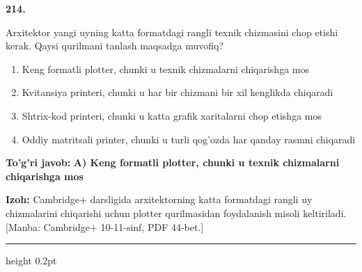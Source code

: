 \documentclass[10pt,a4paper]{article}
\begin{document}
{\bfseries\sffamily\color{ink} 214.}
\par
Arxitektor yangi uyning katta formatdagi rangli texnik chizmasini chop etishi kerak. Qaysi qurilmani tanlash maqsadga muvofiq?
\begin{enumerate}[label=\Alph*),leftmargin=9mm]
\item Keng formatli plotter, chunki u texnik chizmalarni chiqarishga mos
\item Kvitansiya printeri, chunki u har bir chizmani bir xil kenglikda chiqaradi
\item Shtrix-kod printeri, chunki u katta grafik xaritalarni chop etishga mos
\item Oddiy matritsali printer, chunki u turli qog'ozda har qanday rasmni chiqaradi
\end{enumerate}
\begin{tcolorbox}[enhanced,breakable,colback=teal!4,colframe=teal!60!black,boxrule=0.45pt,arc=1.2mm,left=2.7mm,right=2.7mm,top=1.8mm,bottom=1.8mm,before skip=2mm,after skip=2mm]
{\bfseries\sffamily\color{teal}To'g'ri javob:} \textbf{A) Keng formatli plotter, chunki u texnik chizmalarni chiqarishga mos}
\par\smallskip
{\bfseries Izoh:} Cambridge+ darsligida arxitektorning katta formatdagi rangli uy chizmalarini chiqarishi uchun plotter qurilmasidan foydalanish misoli keltiriladi. [Manba: Cambridge+ 10-11-sinf, PDF 44-bet.]
\end{tcolorbox}
\vspace{2mm}\hrule height 0.2pt\vspace{3mm}
\end{document}
